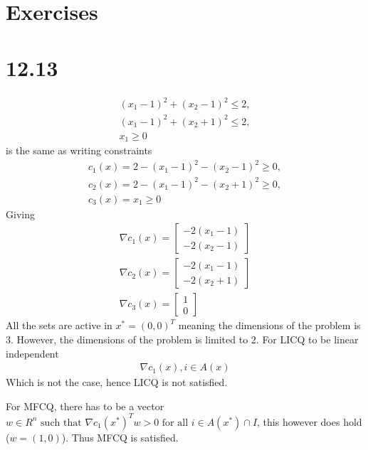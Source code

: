 \documentclass[11pt]{article} %
\begin{document}
\section{Exercises}
\section*{12.13}
\begin{gather*}
(x_1 - 1)^2 + (x_2 -1)^2 \leq 2,\\
(x_1 -1)^2 + (x_2 +1)^2 \leq 2,\\
x_1 \geq 0
\end{gather*}
is the same as writing constraints
\begin{gather*}
c_1(x) = 2 - (x_1-1)^2-(x_2-1)^2\geq 0,\\
c_2(x)=2-(x_1-1)^2-(x_2+1)^2\geq 0,\\
c_3(x)=x_1 \geq 0
\end{gather*}
Giving
\begin{gather*}
\nabla c_1(x) = \begin{bmatrix}-2(x_1 -1) \\ -2(x_2 -1)\end{bmatrix}\\
\nabla c_2(x) = \begin{bmatrix}-2(x_1 -1) \\ -2(x_2 +1)\end{bmatrix}\\
\nabla c_3(x) = \begin{bmatrix}1\\0\end{bmatrix}
\end{gather*}
All the sets are active in \begin{math}x^* = (0,0)^T\end{math} meaning the dimensions of the problem is 3. However, the dimensions of the problem is limited to 2. For LICQ to be linear independent
\begin{gather*}
\nabla c_1(x), i\in A(x)
\end{gather*}
Which is not the case, hence LICQ is not satisfied.

For MFCQ, there has to be a vector \begin{math}w\in R^n \text{ such that } \nabla c_1(x^*)^T w > 0 \text{ for all } i \in A(x^*) \cap  I\end{math}, this however does hold (\begin{math}w=(1,0)\end{math}). Thus MFCQ is satisfied.
\end{document}
